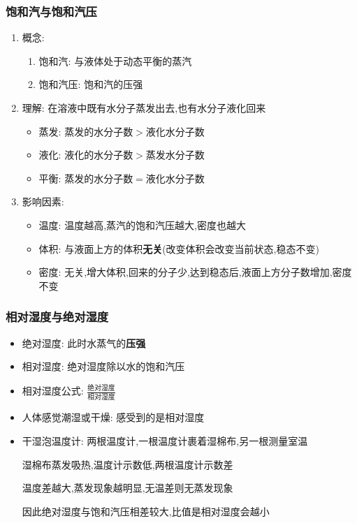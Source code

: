 \documentclass{article}
\begin{document}
\subsubsection{饱和汽与饱和汽压}
\begin{enumerate}
    \item 概念: 
    \begin{enumerate}[label = (\arabic*)]
        \item 饱和汽: 与液体处于动态平衡的蒸汽
        \item 饱和汽压: 饱和汽的压强
    \end{enumerate}
    \item 理解: 在溶液中既有水分子蒸发出去,也有水分子液化回来
    \begin{itemize}
        \item 蒸发: 蒸发的水分子数$>$液化水分子数
        \item 液化: 液化的水分子数$>$蒸发水分子数
        \item 平衡: 蒸发的水分子数$=$液化水分子数
    \end{itemize}
    \item 影响因素: 
    \begin{itemize}
        \item 温度: 温度越高,蒸汽的饱和汽压越大,密度也越大
        \item 体积: 与液面上方的体积\textbf{无关}(改变体积会改变当前状态,稳态不变)
        \item 密度: 无关,增大体积,回来的分子少,达到稳态后,液面上方分子数增加,密度不变
    \end{itemize}
\end{enumerate}

\vspace{2em}

\subsubsection{相对湿度与绝对湿度}
\begin{itemize}
    \item 绝对湿度: 此时水蒸气的\textbf{压强}
    \item 相对湿度: 绝对湿度除以水的饱和汽压
    \item 相对湿度公式: $ \frac{\text{绝对湿度}}{\text{相对湿度}} $
    \item 人体感觉潮湿或干燥: 感受到的是相对湿度
    \item 干湿泡温度计: 两根温度计,一根温度计裹着湿棉布,另一根测量室温
    
    \hspace{6.6em} 湿棉布蒸发吸热,温度计示数低,两根温度计示数差

    \hspace{6.6em} 温度差越大,蒸发现象越明显,无温差则无蒸发现象

    \hspace{6.6em} 因此绝对湿度与饱和汽压相差较大,比值是相对湿度会越小
\end{itemize}
 
\end{document}
